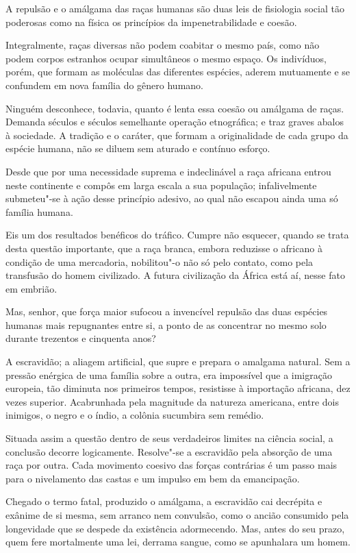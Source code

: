 \begin{linenumbers}

A repulsão e o amálgama das raças humanas são duas leis de fisiologia
social tão poderosas como na física os princípios da impenetrabilidade
e coesão.

Integralmente, raças diversas não podem coabitar o mesmo país, como não
podem corpos estranhos ocupar simultâneos o mesmo espaço. Os
indivíduos, porém, que formam as moléculas das diferentes espécies,
aderem mutuamente e se confundem em nova família do gênero humano. 

Ninguém desconhece, todavia, quanto é lenta essa coesão ou amálgama de
raças. Demanda séculos e séculos semelhante operação etnográfica; e
traz graves abalos à sociedade. A tradição e o caráter, que formam a
originalidade de cada grupo da espécie humana, não se diluem sem
aturado e contínuo esforço.

Desde que por uma necessidade suprema e indeclinável a raça africana
entrou neste continente e compôs em larga escala a sua população;
infalivelmente submeteu"-se à ação desse princípio adesivo, ao qual
não escapou ainda uma só família humana.

Eis um dos resultados benéficos do tráfico. Cumpre não esquecer, quando
se trata desta questão importante, que a raça branca, embora reduzisse
o africano à condição de uma mercadoria, nobilitou"-o não só pelo
contato, como pela transfusão do homem civilizado. A futura civilização
da África está aí, nesse fato em embrião.

Mas, senhor, que força maior sufocou a invencível repulsão das duas
espécies humanas mais repugnantes entre si, a ponto de as concentrar no
mesmo solo durante trezentos e cinquenta anos? 

A escravidão; a aliagem artificial, que supre e prepara o amalgama
natural. Sem a pressão enérgica de uma família sobre a outra, era
impossível que a imigração europeia, tão diminuta nos primeiros tempos,
resistisse à importação africana, dez vezes superior. Acabrunhada pela
magnitude da natureza americana, entre dois inimigos, o negro e o
índio, a colônia sucumbira sem remédio.

Situada assim a questão dentro de seus verdadeiros limites na ciência
social, a conclusão decorre logicamente. Resolve"-se a escravidão pela
absorção de uma raça por outra. Cada movimento coesivo das forças
contrárias é um passo mais para o nivelamento das castas e um impulso
em bem da emancipação.

Chegado o termo fatal, produzido o amálgama, a escravidão cai decrépita
e exânime de si mesma, sem arranco nem convulsão, como o ancião
consumido pela longevidade que se despede da existência adormecendo.
Mas, antes do seu prazo, quem fere mortalmente uma lei, derrama sangue,
como se apunhalara um homem.


\end{linenumbers}
